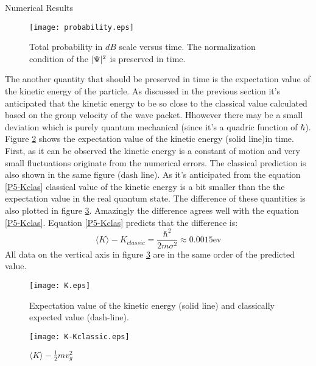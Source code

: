 \begin{homeworkProblem}
\begin{homeworkSection}{Numerical Results}
\begin{figure}[!h]
\centering
\texttt{[image: probability.eps]}
\caption{\small  Total probability in $dB$ scale versus time. The normalization condition of the $\lvert\Psi\rvert^2$ is  preserved in time. }
\label{fig:prob}
\end{figure} 


The another quantity that should be preserved in time is the expectation value of the kinetic energy of the particle. As discussed in the previous section it's anticipated that the kinetic energy to be so close to the classical value calculated based on the group velocity of the wave packet. Hhowever there may be a small deviation which is purely quantum mechanical (since it's a quadric function of $\hbar$). Figure \ref{fig-KK} shows the expectation value of the kinetic energy (solid line)in time.
First, as it can be observed the kinetic energy is a constant of motion and very small fluctuations originate from the numerical errors. The classical prediction is also shown in the same figure (dash line). As it's anticipated from the equation \eqref{P5-Kclas} classical value of the kinetic energy is a bit smaller than the the expectation value in the real quantum state. The difference of these quantities is also plotted in figure \ref{fig:K-Kclassic}. Amazingly the difference agrees well with the equation \eqref{P5-Kclas}. Equation \eqref{P5-Kclas} predicts that the difference is:
$$\langle K\rangle-K_{classic}=\frac{\hbar^2}{2m\sigma^2}\approx 0.0015 \mathrm{ev}$$
All data on the vertical axis in figure \ref{fig:K-Kclassic} are in the same order of the predicted value.



\begin{figure}[!h]
\centering
\texttt{[image: K.eps]}
\caption{\small  Expectation value of the kinetic energy (solid line) and classically expected value (dash-line). }
\label{fig-KK}
\end{figure} 
\begin{figure}[!h]
\centering
\texttt{[image: K-Kclassic.eps]}
\caption{\small  $\langle K\rangle -\frac{1}{2}mv_g^2$  }
\label{fig:K-Kclassic}
\end{figure} 





\end{homeworkSection}



\end{homeworkProblem}

